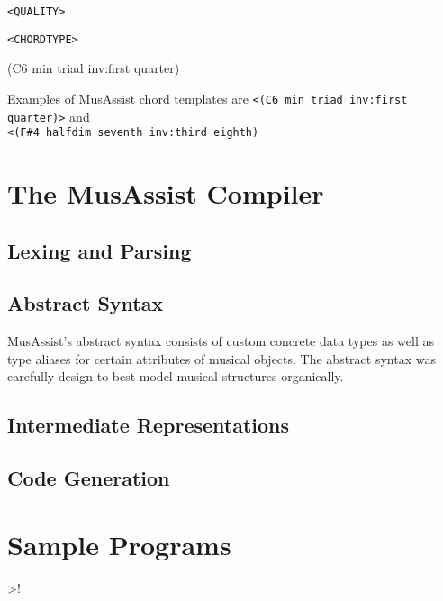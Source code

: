 \documentclass{report}
\newcommand\param[1]{\verb!<#1>!}
\begin{document}
\param{QUALITY}

\param{CHORDTYPE}



(C6 min triad inv:first quarter)


Examples of MusAssist chord templates are \param{(C6 min triad inv:first quarter)} and  \\\param{(F#4 halfdim seventh inv:third eighth)!


\chapter{The MusAssist Compiler}
\section{Lexing and Parsing}
\section{Abstract Syntax}
MusAssist's abstract syntax consists of custom concrete data types as well as type aliases for certain attributes of musical objects. The abstract syntax was carefully design to best model musical structures organically.
\section{Intermediate Representations}
\section{Code Generation}

\chapter{Sample Programs}

}
\end{document}

